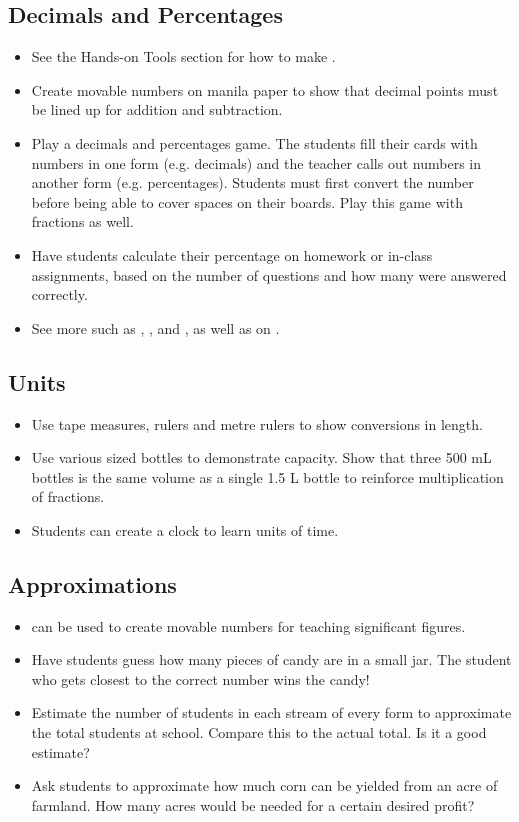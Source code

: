 	\subsection{Decimals and Percentages} \label{decspercents}
	\begin{itemize}
	\item See the Hands-on Tools section for how to make .
	\item Create movable numbers on manila paper to show that decimal points must be lined up for addition and subtraction.
	\item Play a decimals and percentages  game. The students fill their cards with numbers in one form (e.g. decimals) and the teacher calls out numbers in another form (e.g. percentages). Students must first convert the number before being able to cover spaces on their boards. Play this game with fractions as well.
	\item Have students calculate their percentage on homework or in-class assignments, based on the number of questions and how many were answered correctly. 
	\item See more  such as , ,  and , as well as  on .
	\end{itemize}
	
	\subsection{Units}
	\begin{itemize}
	\item Use tape measures, rulers and metre rulers to show conversions in length.
	\item Use various sized bottles to demonstrate capacity. Show that three 500 mL bottles is the same volume as a single 1.5 L bottle to reinforce multiplication of fractions.
	\item Students can create a clock to learn units of time.
	\end{itemize}
	
	\subsection{Approximations}
	\begin{itemize}
	\item {} can be used to create movable numbers for teaching significant figures.
	\item Have students guess how many pieces of candy are in a small jar. The student who gets closest to the correct number wins the candy!
	\item Estimate the number of students in each stream of every form to approximate the total students at school. Compare this to the actual total. Is it a good estimate?
	\item Ask students to approximate how much corn can be yielded from an acre of farmland. How many acres would be needed for a certain desired profit?
	\end{itemize}
	
